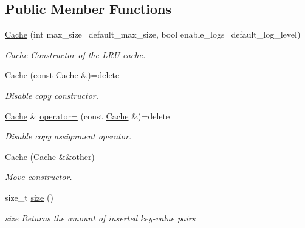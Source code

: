 \subsection*{Public Member Functions}
\begin{DoxyCompactItemize}
\item 
\mbox{\hyperlink{class_cache_a7b08c5e504d8421f25c9770fd9767bb9}{Cache}} (int max\+\_\+size=default\+\_\+max\+\_\+size, bool enable\+\_\+logs=default\+\_\+log\+\_\+level)
\begin{DoxyCompactList}\small\item\em \mbox{\hyperlink{class_cache}{Cache}} Constructor of the L\+RU cache. \end{DoxyCompactList}\item 
\mbox{\label{class_cache_a3aefcab2524308769e78a55e577c27d0}} 
\mbox{\hyperlink{class_cache_a3aefcab2524308769e78a55e577c27d0}{Cache}} (const \mbox{\hyperlink{class_cache}{Cache}} \&)=delete
\begin{DoxyCompactList}\small\item\em Disable copy constructor. \end{DoxyCompactList}\item 
\mbox{\label{class_cache_ab01de8bf45a4ef5270fbbdc1eb89acc1}} 
\mbox{\hyperlink{class_cache}{Cache}} \& \mbox{\hyperlink{class_cache_ab01de8bf45a4ef5270fbbdc1eb89acc1}{operator=}} (const \mbox{\hyperlink{class_cache}{Cache}} \&)=delete
\begin{DoxyCompactList}\small\item\em Disable copy assignment operator. \end{DoxyCompactList}\item 
\mbox{\label{class_cache_a6856a2f982670307b356e4d4c8914a33}} 
\mbox{\hyperlink{class_cache_a6856a2f982670307b356e4d4c8914a33}{Cache}} (\mbox{\hyperlink{class_cache}{Cache}} \&\&other)
\begin{DoxyCompactList}\small\item\em Move constructor. \end{DoxyCompactList}\item 
size\+\_\+t \mbox{\hyperlink{class_cache_a79c6990c4265acdd65f8fcafdbeb62bb}{size}} ()
\begin{DoxyCompactList}\small\item\em size Returns the amount of inserted key-\/value pairs \end{DoxyCompactList}\item 

\end{DoxyCompactItemize}
